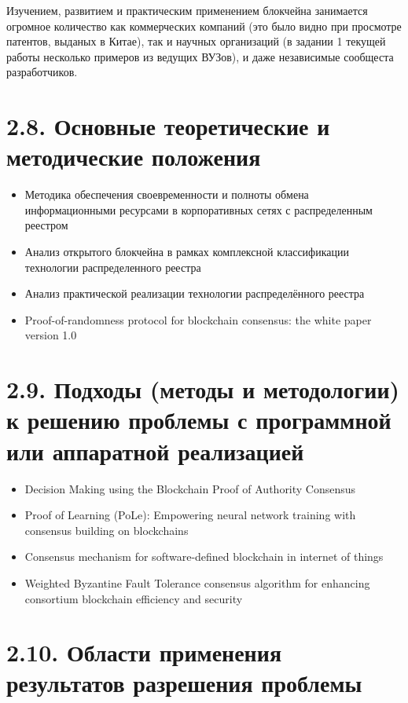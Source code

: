 \documentclass[a4paper, 12pt]{report}		%
\begin{document}
Изучением, развитием и практическим применением блокчейна занимается огромное количество как коммерческих компаний (это было видно при просмотре патентов, выданых в Китае), так и научных организаций (в задании 1 текущей работы несколько примеров из ведущих ВУЗов), и даже независимые сообщеста разработчиков.

\section*{2.8. Основные теоретические и методические положения}

\begin{itemize}
\item Методика обеспечения своевременности и полноты обмена информационными ресурсами в корпоративных сетях с распределенным реестром
\item Анализ открытого блокчейна в рамках комплексной классификации технологии распределенного реестра
\item Анализ практической реализации технологии распределённого реестра
\item Proof-of-randomness protocol for blockchain consensus: the white paper version 1.0
\end{itemize}

\section*{2.9. Подходы (методы и методологии) к решению проблемы с программной или аппаратной реализацией}

\begin{itemize}
\item Decision Making using the Blockchain Proof of Authority Consensus
\item Proof of Learning (PoLe): Empowering neural network training with consensus building on blockchains
\item Consensus mechanism for software-defined blockchain in internet of things
\item Weighted Byzantine Fault Tolerance consensus algorithm for enhancing consortium blockchain efficiency and security
\end{itemize}

\section*{2.10. Области применения результатов разрешения проблемы}
\end{document}
